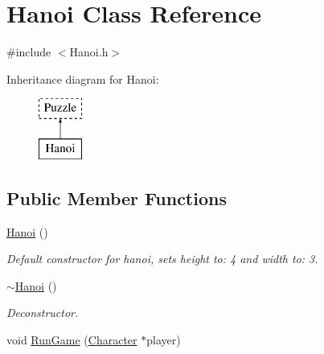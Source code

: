 \hypertarget{classHanoi}{\section{Hanoi Class Reference}
\label{classHanoi}
}


{\ttfamily \#include $<$Hanoi.\-h$>$}

Inheritance diagram for Hanoi\-:\begin{figure}[H]
\begin{center}
\leavevmode
\includegraphics[height=2.000000cm]{classHanoi}
\end{center}
\end{figure}
\subsection*{Public Member Functions}
\begin{DoxyCompactItemize}
\item 
\hyperlink{classHanoi_a2af453ec21277f20edc002be08f22346}{Hanoi} ()
\begin{DoxyCompactList}\small\item\em Default constructor for hanoi, sets height to\-: 4 and width to\-: 3. \end{DoxyCompactList}\item 
\hyperlink{classHanoi_a59760291bfeda65330ff53c429a4e55b}{$\sim$\-Hanoi} ()
\begin{DoxyCompactList}\small\item\em Deconstructor. \end{DoxyCompactList}\item 
void \hyperlink{classHanoi_a294a2a533b7f3305391aa880f7a0eb36}{Run\-Game} (\hyperlink{classCharacter}{Character} $\ast$player)
\end{DoxyCompactItemize}
